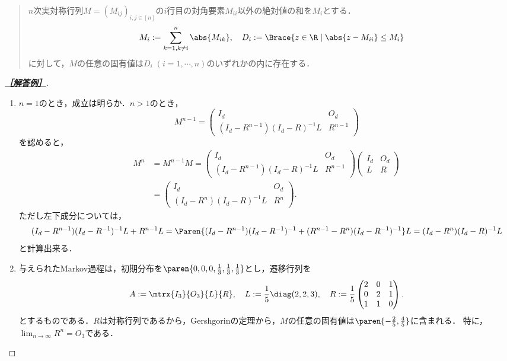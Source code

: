 \documentclass[uplatex,dvipdfmx]{jsarticle}
\begin{document}
\begin{tcolorbox}[colframe=ForestGreen, colback=ForestGreen!10!white,breakable,colbacktitle=ForestGreen!40!white,coltitle=black,fonttitle=\bfseries\sffamily,
    title=第４問]
\begin{problem}
\begin{enumerate}
\begin{quote}
                $n$次実対称行列$M=(M_{ij})_{i,j\in[n]}$の$i$行目の対角要素$M_{ii}$以外の絶対値の和を$M_i$とする．
                \[M_i:=\sum_{k=1,k\ne i}^n\abs{M_{ik}},\quad D_i:=\Brace{z\in\R\mid\abs{z-M_{ii}}\le M_i}\]
                に対して，$M$の任意の固有値は$D_i\;(i=1,\cdots,n)$のいずれかの内に存在する．
            \end{quote}
        \end{enumerate}
    \end{problem}
\end{tcolorbox}
\begin{proof}[\textbf{\underline{［解答例］}}]\mbox{}
    \begin{enumerate}
        \item $n=1$のとき，成立は明らか．$n>1$のとき，
        \[M^{n-1}=\begin{pmatrix}I_d&O_d\\(I_d-R^{n-1})(I_d-R)^{-1}L&R^{n-1}\end{pmatrix}\]
        を認めると，
        \begin{align*}
            M^n&=M^{n-1}M=\begin{pmatrix}I_d&O_d\\(I_d-R^{n-1})(I_d-R)^{-1}L&R^{n-1}\end{pmatrix}\begin{pmatrix}I_d&O_d\\L&R\end{pmatrix}\\
            &=\begin{pmatrix}I_d&O_d\\(I_d-R^n)(I_d-R)^{-1}L&R^n\end{pmatrix}.
        \end{align*}
        ただし左下成分については，
        \[(I_d-R^{n-1})(I_d-R^{-1})^{-1}L+R^{n-1}L=\Paren{(I_d-R^{n-1})(I_d-R^{-1})^{-1}+(R^{n-1}-R^n)(I_d-R^{-1})^{-1}}L=(I_d-R^n)(I_d-R)^{-1}L\]
        と計算出来る．
        \item 与えられたMarkov過程は，初期分布を$\paren{0,0,0,\frac{1}{3},\frac{1}{3},\frac{1}{3}}$とし，遷移行列を
        \[A:=\mtrx{I_3}{O_3}{L}{R},\quad L:=\frac{1}{5}\diag(2,2,3),\quad R:=\frac{1}{5}\begin{pmatrix}2&0&1\\0&2&1\\1&1&0\end{pmatrix}.\]
        とするものである．$R$は対称行列であるから，Gershgorinの定理から，$M$の任意の固有値は$\paren{-\frac{2}{5},\frac{4}{5}}$に含まれる．
        特に，$\lim_{n\to\infty}R^n=O_3$である．

\end{enumerate}
\end{proof}
\end{document}
